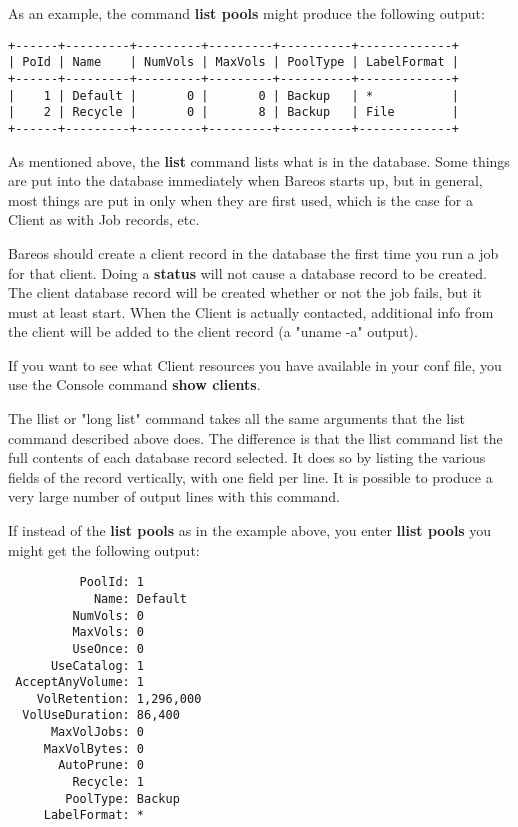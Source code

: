 \begin{description}
{   As an example, the command {\bf list pools} might produce  the following
   output:

\footnotesize
\begin{verbatim}
+------+---------+---------+---------+----------+-------------+
| PoId | Name    | NumVols | MaxVols | PoolType | LabelFormat |
+------+---------+---------+---------+----------+-------------+
|    1 | Default |       0 |       0 | Backup   | *           |
|    2 | Recycle |       0 |       8 | Backup   | File        |
+------+---------+---------+---------+----------+-------------+
\end{verbatim}
\normalsize

   As mentioned above, the {\bf list} command lists what is in the
   database.  Some things are put into the database immediately when Bareos
   starts up, but in general, most things are put in only when they are
   first used, which is the case for a Client as with Job records, etc.

   Bareos should create a client record in the database the first time you
   run a job for that client.  Doing a {\bf status} will not cause a
   database record to be created.  The client database record will be
   created whether or not the job fails, but it must at least start.  When
   the Client is actually contacted, additional info from the client will
   be added to the client record (a "uname -a" output).

   If you want to see what Client resources you have available in your conf
   file, you use the Console command {\bf show clients}.

\item [llist]
   The llist or "long list" command takes all the same arguments that the
   list command described above does.  The difference is that the llist
   command list the full contents of each database record selected.  It
   does so by listing the various fields of the record vertically, with one
   field per line.  It is possible to produce a very large number of output
   lines with this command.

   If instead of the {\bf list pools} as in the example above, you enter
   {\bf llist pools} you might get the following output:

\footnotesize
\begin{verbatim}
          PoolId: 1
            Name: Default
         NumVols: 0
         MaxVols: 0
         UseOnce: 0
      UseCatalog: 1
 AcceptAnyVolume: 1
    VolRetention: 1,296,000
  VolUseDuration: 86,400
      MaxVolJobs: 0
     MaxVolBytes: 0
       AutoPrune: 0
         Recycle: 1
        PoolType: Backup
     LabelFormat: *


\end{verbatim}}
\end{description}
